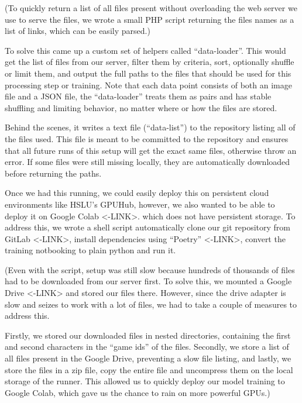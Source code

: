 (To quickly return a list of all files present without overloading the
web server we use to serve the files, we wrote a small PHP script
returning the files names as a list of links, which can be easily
parsed.)

To solve this came up a custom set of helpers called ``data-loader''.
This would get the list of files from our server, filter them by
criteria, sort, optionally shuffle or limit them, and output the full
paths to the files that should be used for this processing step or
training. Note that each data point consists of both an image file and a
JSON file, the ``data-loader'' treats them as pairs and has stable
shuffling and limiting behavior, no matter where or how the files are
stored.

Behind the scenes, it writes a text file (``data-list'') to the
repository listing all of the files used. This file is meant to be
committed to the repository and ensures that all future runs of this
setup will get the exact same files, otherwise throw an error. If some
files were still missing locally, they are automatically downloaded
before returning the paths.

Once we had this running, we could easily deploy this on persistent
cloud environments like HSLU's GPUHub, however, we also wanted to be
able to deploy it on Google Colab \textless-LINK\textgreater. which does
not have persistent storage. To address this, we wrote a shell script
automatically clone our git repository from GitLab
\textless-LINK\textgreater, install dependencies using ``Poetry''
\textless-LINK\textgreater, convert the training notbooking to plain
python and run it.

(Even with the script, setup was still slow because hundreds of
thousands of files had to be downloaded from our server first. To solve
this, we mounted a Google Drive \textless-LINK\textgreater{} and stored
our files there. However, since the drive adapter is slow and seizes to
work with a lot of files, we had to take a couple of measures to address
this.

Firstly, we stored our downloaded files in nested directories,
containing the first and second characters in the ``game ids'' of the
files. Secondly, we store a list of all files present in the Google
Drive, preventing a slow file listing, and lastly, we store the files in
a zip file, copy the entire file and uncompress them on the local
storage of the runner. This allowed us to quickly deploy our model
training to Google Colab, which gave us the chance to rain on more
powerful GPUs.)

